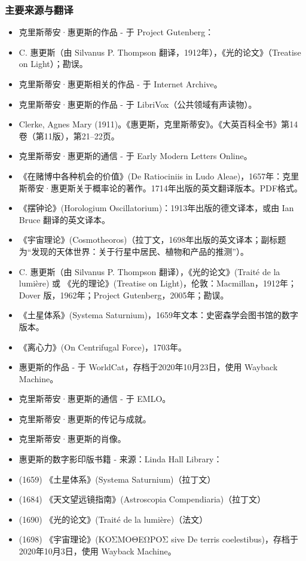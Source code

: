 \subsubsection{主要来源与翻译}
\begin{itemize}
\item 克里斯蒂安·惠更斯的作品 - 于 Project Gutenberg：
\item C. 惠更斯（由 Silvanus P. Thompson 翻译，1912年），《光的论文》（Treatise on Light）；勘误。
\item 克里斯蒂安·惠更斯相关的作品 - 于 Internet Archive。
\item 克里斯蒂安·惠更斯的作品 - 于 LibriVox（公共领域有声读物）。
\item Clerke, Agnes Mary (1911)。《惠更斯，克里斯蒂安》。《大英百科全书》第14卷（第11版），第21–22页。
\item 克里斯蒂安·惠更斯的通信 - 于 Early Modern Letters Online。
\item 《在赌博中各种机会的价值》(De Ratiociniis in Ludo Aleae)，1657年：克里斯蒂安·惠更斯关于概率论的著作。1714年出版的英文翻译版本。PDF格式。
\item 《摆钟论》(Horologium Oscillatorium)：1913年出版的德文译本，或由 Ian Bruce 翻译的英文译本。
\item 《宇宙理论》(Cosmotheoros)（拉丁文，1698年出版的英文译本；副标题为“发现的天体世界：关于行星中居民、植物和产品的推测”）。
\item C. 惠更斯（由 Silvanus P. Thompson 翻译），《光的论文》(Traité de la lumière) 或 《光的理论》(Treatise on Light)，伦敦：Macmillan，1912年；Dover 版，1962年；Project Gutenberg，2005年；勘误。
\item 《土星体系》(Systema Saturnium)，1659年文本：史密森学会图书馆的数字版本。
\item 《离心力》(On Centrifugal Force)，1703年。
\item 惠更斯的作品 - 于 WorldCat，存档于2020年10月23日，使用 Wayback Machine。
\item 克里斯蒂安·惠更斯的通信 - 于 EMLO。
\item 克里斯蒂安·惠更斯的传记与成就。
\item 克里斯蒂安·惠更斯的肖像。
\item 惠更斯的数字影印版书籍 - 来源：Linda Hall Library：
\item (1659) 《土星体系》(Systema Saturnium)（拉丁文）
\item (1684) 《天文望远镜指南》(Astroscopia Compendiaria)（拉丁文）
\item (1690) 《光的论文》(Traité de la lumière)（法文）
\item (1698) 《宇宙理论》(ΚΟΣΜΟΘΕΩΡΟΣ sive De terris coelestibus)，存档于2020年10月3日，使用 Wayback Machine。
\end{itemize}
